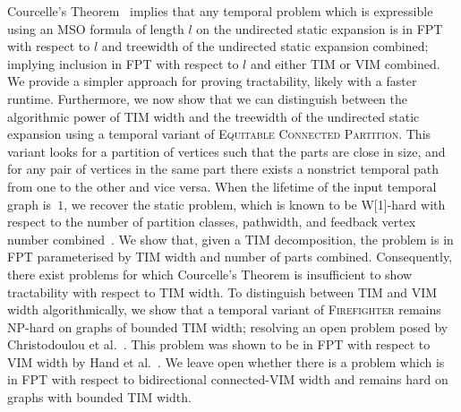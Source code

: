 \documentclass[a4paper,UKenglish,cleveref, autoref, thm-restate]{lipics-v2021} %
\begin{document}
Courcelle's Theorem~\cite{courcelle1997expression} implies that any temporal problem which is expressible using an MSO formula of length $l$ on the undirected static expansion is in FPT with respect to $l$ and treewidth of the undirected static expansion combined; implying inclusion in FPT with respect to $l$ and either TIM or VIM combined. We provide a simpler approach for proving tractability, likely with a faster runtime. Furthermore, we now show that we can distinguish between the algorithmic power of TIM width and the treewidth of the undirected static expansion using a temporal variant of \textsc{Equitable Connected Partition}. This variant looks for a partition of vertices such that the parts are close in size, and for any pair of vertices in the same part there exists a nonstrict temporal path from one to the other and vice versa.
When the lifetime of the input temporal graph is~$1$, we recover the static problem, which is known to be W[1]-hard with respect to the number of partition classes, pathwidth, and feedback vertex number combined~\cite{enciso2009makes}. We show that, given a TIM decomposition, the problem is in FPT parameterised by TIM width and number of parts combined. Consequently, there exist problems for which Courcelle's Theorem is insufficient to show tractability with respect to TIM width. To distinguish between TIM and VIM width algorithmically, we show that a temporal variant of \textsc{Firefighter} remains NP-hard on graphs of bounded TIM width; resolving an open problem posed by Christodoulou et al.~\cite{christodoulou_making_2024}. This problem was shown to be in FPT with respect to VIM width by Hand et al.~\cite{hand_making_2022}. We leave open whether there is a problem which is in FPT with respect to bidirectional connected-VIM width and remains hard on graphs with bounded TIM width. 
\end{document}
